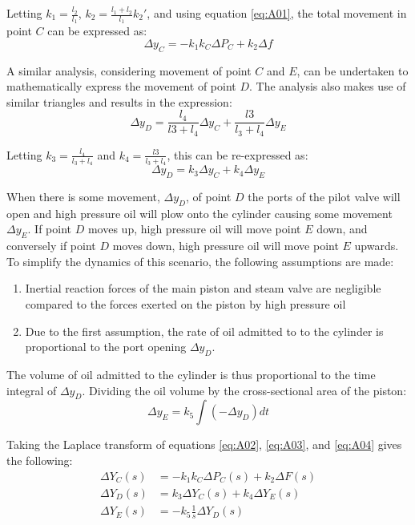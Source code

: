 Letting $k_1 = \frac{l_2}{l_1}$, $k_2 = \frac{l_1 + l_2}{l_1} k_2'$, and using equation \ref{eq:A01}, the total movement in point $C$ can be expressed as:
\begin{equation}
	\Delta y_C = - k_1 k_C \Delta P_C + k_2 \Delta f \label{eq:A02}
\end{equation}

A similar analysis, considering movement of point $C$ and $E$, can be undertaken to mathematically express the movement of point $D$. The analysis also makes use of similar triangles and results in the expression:
\begin{equation}
	\Delta y_D = \frac{l_4}{l3 + l_4} \Delta y_C + \frac{l3}{l_3 + l_4} \Delta y_E
\end{equation}

Letting $k_3 = \frac{l_4}{l_3 + l_4}$ and $k_4 = \frac{l3}{l_3 + l_4}$, this can be re-expressed as:
\begin{equation}
	\Delta y_D = k_3 \Delta y_C + k_4 \Delta y_E \label{eq:A03}
\end{equation}

When there is some movement, $\Delta y_D$, of point $D$ the ports of the pilot valve will open and high pressure oil will plow onto the cylinder causing some movement $\Delta y_E$. If point $D$ moves up, high pressure oil will move point $E$ down, and conversely if point $D$ moves down, high pressure oil will move point $E$ upwards. To simplify the dynamics of this scenario, the following assumptions are made:
\begin{enumerate}
	\item Inertial reaction forces of the main piston and steam valve are negligible compared to the forces exerted on the piston by high pressure oil
	\item Due to the first assumption, the rate of oil admitted to to the cylinder is proportional to the port opening $\Delta y_D$.
\end{enumerate}

The volume of oil admitted to the cylinder is thus proportional to the time integral of $\Delta y_D$. Dividing the oil volume by the cross-sectional area of the piston:
\begin{equation}
	\Delta y_E = k_5 \int (- \Delta y_D) dt \label{eq:A04}
\end{equation}

Taking the Laplace transform of equations \ref{eq:A02}, \ref{eq:A03}, and \ref{eq:A04} gives the following:
\begin{align}
	\Delta Y_C(s) &= -k_1 k_C \Delta P_C(s) + k_2 \Delta F(s) \label{eq:A05} \\
	\Delta Y_D(s) &= k_3 \Delta Y_C(s) + k_4 \Delta Y_E(s) \label{eq:A06} \\
	\Delta Y_E(s) &= - k_5 \frac{1}{s} \Delta Y_D(s) \label{eq:A07}
\end{align}

